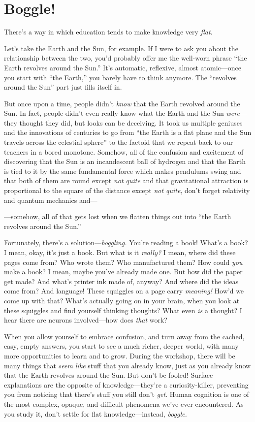 \clearpage
\section*{Boggle!}

There's a way in which education tends to make knowledge very \emph{flat}.

Let's take the Earth and the Sun, for example.  If I were to ask you about the relationship between the two, you'd probably offer me the well-worn phrase ``the Earth revolves around the Sun.''  It's automatic, reflexive, almost atomic---once you start with ``the Earth,'' you barely have to think anymore.  The ``revolves around the Sun'' part just fills itself in.

But once upon a time, people didn't \emph{know} that the Earth revolved around the Sun.  In fact, people didn't even really know what the Earth and the Sun \emph{were}---they thought they did, but looks can be deceiving.  It took us multiple geniuses and the innovations of centuries to go from ``the Earth is a flat plane and the Sun travels across the celestial sphere'' to the factoid that we repeat back to our teachers in a bored monotone.  Somehow, all of the confusion and excitement of discovering that the Sun is an incandescent ball of hydrogen and that the Earth is tied to it by the same fundamental force which makes pendulums swing and that both of them are round except \emph{not quite} and that gravitational attraction is proportional to the square of the distance except \emph{not quite}, don't forget relativity and quantum mechanics and---

---somehow, all of that gets lost when we flatten things out into ``the Earth revolves around the Sun.''

Fortunately, there's a solution---\emph{boggling.}  You're reading a book!  What's a book?  I mean, okay, it's just a book.  But what is it \emph{really?}  I mean, where did these pages come from?  Who wrote them?  Who manufactured them?  How could \emph{you} make a book?  I mean, maybe you've already made one.  But how did the paper get made?  And what's printer ink made of, anyway?  And where did the ideas come from?  And language!  These squiggles on a page carry \emph{meaning!}  How'd we come up with that?  What's actually going on in your brain, when you look at these squiggles and find yourself thinking thoughts?  What even \emph{is} a thought?  I hear there are neurons involved---how does \emph{that} work?

When you allow yourself to embrace confusion, and turn away from the cached, easy, empty answers, you start to see a much richer, deeper world, with many more opportunities to learn and to grow.  During the workshop, there will be many things that \emph{seem like} stuff that you already know, just as you already know that the Earth revolves around the Sun.  But don't be fooled!  Surface explanations are the opposite of knowledge---they're a curiosity-killer, preventing you from noticing that there's stuff you still don't \emph{get}.  Human cognition is one of the most complex, opaque, and difficult phenomena we've ever encountered.  As you study it, don't settle for flat knowledge---instead, \emph{boggle.}